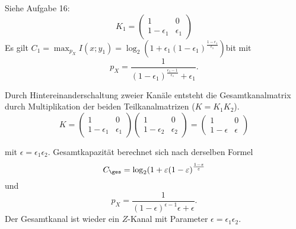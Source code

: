 \documentclass{article}
\begin{document}
\begin{solution}
    \begin{tasks}
            \item Siehe Aufgabe 16:
        $$
        K_1=
        \begin{pmatrix}
            1 & 0\\
            1-\epsilon_1 & \epsilon_1
        \end{pmatrix}
        $$
        Es gilt $C_1 = \max_{p_X}{I(x;y_1)} = \log_2(1+\epsilon_1{(1-\epsilon_1)}^{\frac{1-\epsilon_1}{\epsilon_1}})$bit mit
            $$
            p_X = \frac 1 {{(1-\epsilon_1)}^{\frac{\epsilon_1-1}{\epsilon_1}}+\epsilon_1}.
            $$
                \item Durch Hintereinanderschaltung zweier Kanäle entsteht die Gesamtkanalmatrix durch Multiplikation der beiden Teilkanalmatrizen ($K=K_1K_2$).
            $$
            K =
            \begin{pmatrix}
                1 & 0 \\
                1-\epsilon_1 & \epsilon_1
            \end{pmatrix}
            \begin{pmatrix}
                1 & 0 \\
                1-\epsilon_2 & \epsilon_2
            \end{pmatrix}
            =
            \begin{pmatrix}
                1 & 0 \\
                1-\epsilon & \epsilon
            \end{pmatrix}
            $$
        \end{tasks}
        mit $\epsilon=\epsilon_1\epsilon_2$. Gesamtkapazität berechnet sich nach derselben Formel
        $$
        C_{\ges} = \log_2(1+\epsilon{(1-\epsilon)}^{\frac{1-\epsilon}{\epsilon}}
        $$
        und
        $$
        p_X = \frac 1 {{(1-\epsilon)}^{\epsilon-1}{\epsilon}+\epsilon}.
        $$
        Der Gesamtkanal ist wieder ein $Z$-Kanal mit Parameter $\epsilon=\epsilon_1\epsilon_2$.
\end{solution}
\end{document}
